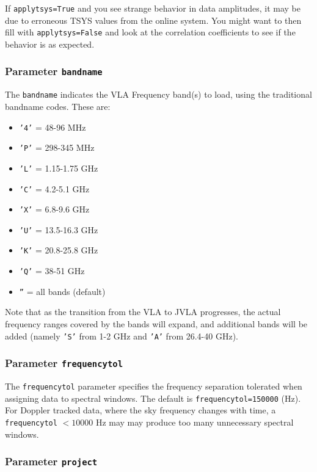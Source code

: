 If {\tt applytsys=True} and you see strange behavior in data
amplitudes, it may be due to erroneous TSYS values from the online
system.  You might want to then fill with {\tt applytsys=False} 
and look at the correlation coefficients to see if the behavior is
as expected.

\subsubsection{Parameter {\tt bandname} }
\label{section:io.import.vla.bandname}

The {\tt bandname} indicates the VLA Frequency band(s) to load,
using the traditional bandname codes.  These are:
\begin{itemize}
  \item {\tt '4'} =   48-96 MHz
  \item {\tt 'P'} =  298-345 MHz
  \item {\tt 'L'} = 1.15-1.75 GHz
  \item {\tt 'C'} =  4.2-5.1 GHz
  \item {\tt 'X'} =  6.8-9.6 GHz
  \item {\tt 'U'} = 13.5-16.3 GHz
  \item {\tt 'K'} = 20.8-25.8 GHz
  \item {\tt 'Q'} =   38-51 GHz
  \item {\tt ''}  = all bands (default)
\end{itemize}

Note that as the transition from the VLA to JVLA progresses,
the actual frequency ranges covered by the bands will expand,
and additional bands will be added (namely {\tt 'S'} from 1-2 GHz and 
{\tt 'A'} from 26.4-40 GHz).

\subsubsection{Parameter {\tt frequencytol} }
\label{section:io.import.vla.frequencytol}

The {\tt frequencytol} parameter specifies the frequency separation
tolerated when assigning data to spectral windows.  The
default is {\tt frequencytol=150000} (Hz).  
For Doppler tracked data, where the sky frequency changes with time,
a {\tt frequencytol} $< 10000$ Hz may may produce too many
unnecessary spectral windows.

\subsubsection{Parameter {\tt project} }
\label{section:io.import.vla.project}

